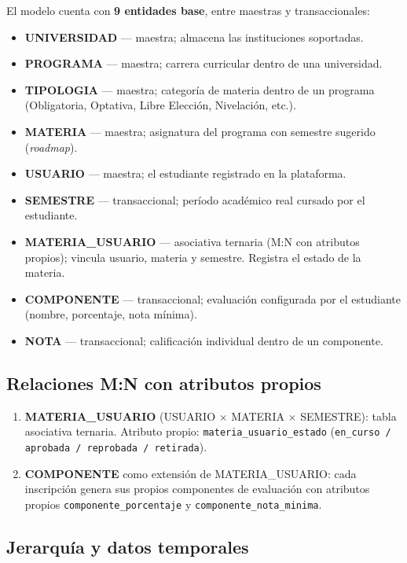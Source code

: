 \documentclass[12pt, letterpaper, twoside]{article}
\begin{document}
El modelo cuenta con \textbf{9 entidades base}, entre maestras y transaccionales:

\begin{itemize}[leftmargin=1.5em]
  \item \textbf{UNIVERSIDAD} --- maestra; almacena las instituciones soportadas.
  \item \textbf{PROGRAMA} --- maestra; carrera curricular dentro de una universidad.
  \item \textbf{TIPOLOGIA} --- maestra; categoría de materia dentro de un programa
        (Obligatoria, Optativa, Libre Elección, Nivelación, etc.).
  \item \textbf{MATERIA} --- maestra; asignatura del programa con semestre sugerido (\textit{roadmap}).
  \item \textbf{USUARIO} --- maestra; el estudiante registrado en la plataforma.
  \item \textbf{SEMESTRE} --- transaccional; período académico real cursado por el estudiante.
  \item \textbf{MATERIA\_USUARIO} --- asociativa ternaria (M:N con atributos propios);
        vincula usuario, materia y semestre. Registra el estado de la materia.
  \item \textbf{COMPONENTE} --- transaccional; evaluación configurada por el estudiante
        (nombre, porcentaje, nota mínima).
  \item \textbf{NOTA} --- transaccional; calificación individual dentro de un componente.
\end{itemize}

\subsection{Relaciones M:N con atributos propios}

\begin{enumerate}[leftmargin=1.5em]
  \item \textbf{MATERIA\_USUARIO} (USUARIO $\times$ MATERIA $\times$ SEMESTRE): tabla
  asociativa ternaria. Atributo propio: \texttt{materia\_usuario\_estado}
  (\texttt{en\_curso / aprobada / reprobada / retirada}).
  \item \textbf{COMPONENTE} como extensión de MATERIA\_USUARIO: cada inscripción
  genera sus propios componentes de evaluación con atributos propios
  \texttt{componente\_porcentaje} y \texttt{componente\_nota\_minima}.
\end{enumerate}

\subsection{Jerarquía y datos temporales}
\end{document}

